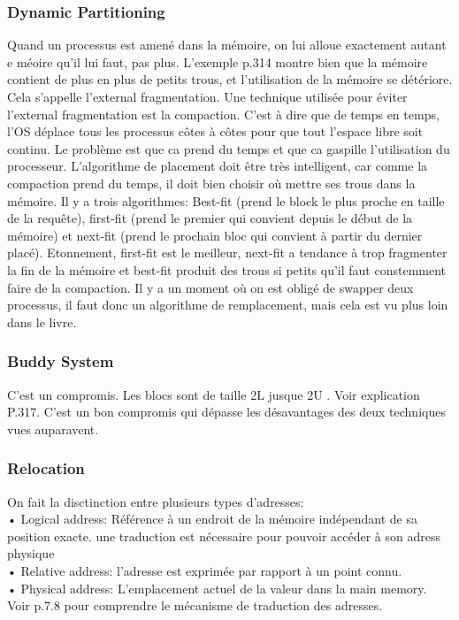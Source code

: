 \subsubsection{Dynamic Partitioning}
Quand un processus est amené dans la mémoire, on lui alloue exactement autant e méoire qu’il lui faut, pas plus. L’exemple p.314 montre bien que la mémoire contient de plus en plus de petits trous, et l’utilisation de la mémoire se détériore. Cela s’appelle l’external fragmentation. Une technique utilisée pour éviter l’external fragmentation est la compaction. C’est à dire que de temps en temps, l’OS déplace tous les processus côtes à côtes pour que tout l’espace libre soit continu. Le problème est que ca prend du temps et que ca gaspille l’utilisation du processeur.
L’algorithme de placement doit être très intelligent, car comme la compaction prend du temps, il doit bien choisir où mettre ses trous dans la mémoire. Il y a trois algorithmes: Best-fit (prend le block le plus proche en taille de la requête), first-fit (prend le premier qui convient depuis le début de la mémoire) et next-fit (prend le prochain bloc qui convient à partir du dernier placé). Etonnement, first-fit est le meilleur, next-fit a tendance à trop fragmenter la fin de la mémoire et best-fit produit des trous si petits qu’il faut constemment faire de la compaction.
Il y a un moment où on est obligé de swapper deux processus, il faut donc un algorithme de remplacement, mais cela est vu plus loin dans le livre.
\subsubsection{Buddy System}
C’est un compromis. Les blocs sont de taille 2L jusque 2U . Voir explication P.317. C’est un bon compromis qui dépasse les désavantages des deux techniques vues auparavent.
\subsubsection{Relocation}
On fait la disctinction entre plusieurs types d’adresses: \\
• Logical address: Référence à un endroit de la mémoire indépendant de sa position exacte. une traduction est nécessaire pour pouvoir accéder à son adress physique \\
• Relative address: l’adresse est exprimée par rapport à un point connu. \\
• Physical address: L’emplacement actuel de la valeur dans la main memory. Voir p.7.8 pour comprendre le mécanisme de traduction des adresses.
